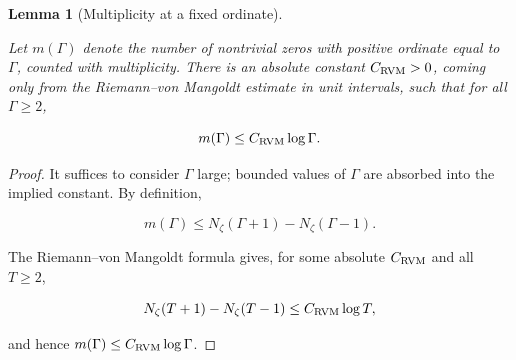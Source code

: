 \documentclass[11pt]{amsart}
\numberwithin{equation}{section}
\theoremstyle{plain}
\newtheorem{lemma}[theorem]{Lemma}
\theoremstyle{definition}
\theoremstyle{remark}
\begin{document}
\begin{lemma}[Multiplicity at a fixed ordinate]
\label{lem:multiplicity_fixed_ordinate}

Let \(m(\Gamma)\) denote the number of nontrivial zeros with positive
ordinate equal to \(\Gamma\), counted with multiplicity. There is an
absolute constant \(C_{\rm RVM}>0\), coming only from the
Riemann--von Mangoldt estimate in unit intervals, such that for all
\(\Gamma\ge2\),

\begin{equation}
m(\Gamma)\le C_{\rm RVM}\log \Gamma.
\label{eq:fixed_ordinate_multiplicity_bound}
\end{equation}

\end{lemma}

\begin{proof}
It suffices to consider \(\Gamma\) large; bounded values of \(\Gamma\)
are absorbed into the implied constant. By definition,

\begin{equation}
m(\Gamma)
\le
N_\zeta(\Gamma+1)-N_\zeta(\Gamma-1).
\end{equation}

The Riemann--von Mangoldt formula gives, for some absolute
\(C_{\rm RVM}\) and all \(T\ge2\),

\begin{equation}
N_\zeta(T+1)-N_\zeta(T-1)\le C_{\rm RVM}\log T,
\end{equation}

and hence \(m(\Gamma)\le C_{\rm RVM}\log \Gamma\).
\end{proof}
\end{document}
